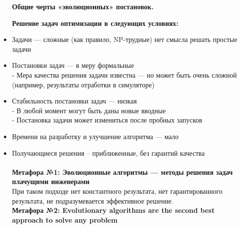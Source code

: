 \begin{itemize}
\begin{center}
     \textbf{Общие черты «эволюционных» постановок.\\}
\end{center}
 \textbf{Решение задач оптимизации в следующих условиях:}
\item Задачи — сложные (как правило, NP-трудные) нет смысла решать простые задачи
\item Постановки задач — в меру формальные\\
- Мера качества решения задачи известна — но может быть очень сложной (например, результаты отработки в симуляторе)
\item Стабильность постановки задач — низкая\\
- В любой момент могут быть даны новые вводные\\
- Постановка задачи может измениться после пробных запусков
\item Времени на разработку и улучшение алгоритма — мало
\item Получающиеся решения – приближенные, без гарантий качества\\
\\
\textbf{Метафора №1: Эволюционные алгоритмы — методы решения задач плачущими инженерами\\}
При таком подходе нет константного результата, нет гарантированного результата, не подразумевается эффективное решение. \\
\textbf{Метафора №2: Evolutionary algorithms are the second best approach to solve any problem\\}
\end{itemize}
